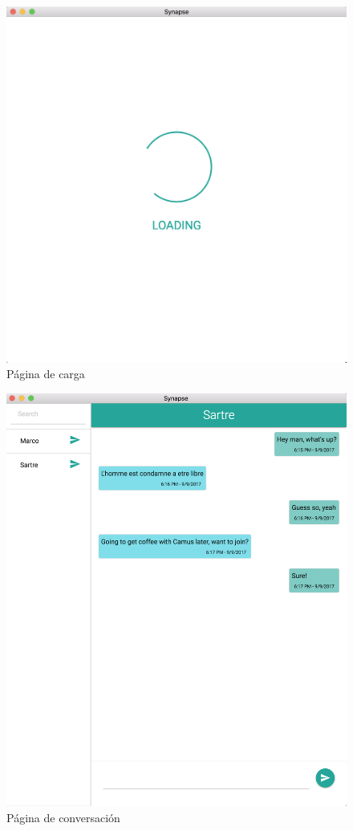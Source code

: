 \begin{figure}[H]
	\centering
	\includegraphics[width=\textwidth, cfbox=black .5pt .5pt]{imagenes/desktop-loading-page}
	\caption{Página de carga}
	\label{fig:desktop-loading-page}
\end{figure}

\begin{figure}[H]
	\centering
	\includegraphics[width=\textwidth, cfbox=black .5pt .5pt]{imagenes/desktop-conversation-page}
	\caption{Página de conversación}
	\label{fig:desktop-conversation}
\end{figure}